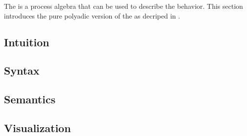 The \findex[\picalc{}|(]{\picalc{}} is a process algebra that can be used to describe the behavior. This section introduces the pure polyadic version of the \picalc{} as decriped in \cite{milner}. 


\subsection{Intuition}
\label{sec_pi_intuition}


\subsection{Syntax}
\label{sec_pi_syntax}


\subsection{Semantics}
\label{sec_pi_sem}


\subsection{Visualization}
\label{sec_pi_visualization}


\newpage %
